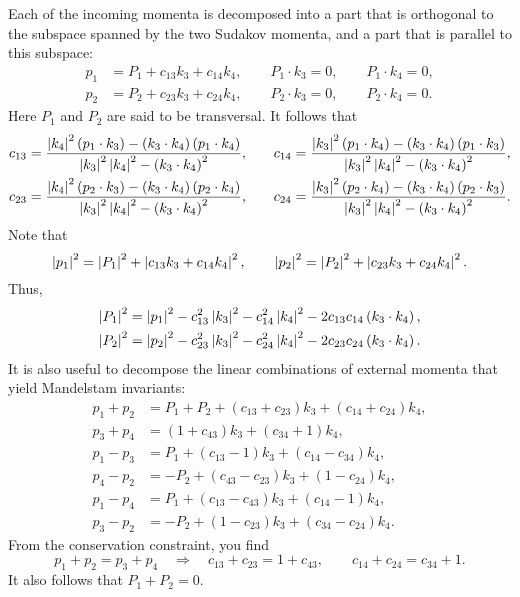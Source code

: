 Each of the incoming momenta is decomposed into a part that is orthogonal to the subspace spanned by the two Sudakov momenta, and a part that is parallel to this subspace:
\begin{align}
	p_{1} &= P_{1} + c_{13} k_{3} + c_{14} k_{4}, \qquad P_{1} \cdot k_{3} = 0, \qquad P_{1} \cdot k_{4} = 0, \\
	p_{2} &= P_{2} + c_{23} k_{3} + c_{24} k_{4}, \qquad P_{2} \cdot k_{3} = 0, \qquad P_{2} \cdot k_{4} = 0.
\end{align}
Here $P_{1}$ and $P_{2}$ are said to be transversal. It follows that
\begin{align}
	c_{13} = \frac{ \left\lvert k_{4} \right\rvert^{2} \left(p_{1} \cdot k_{3} \right) - \left(k_{3} \cdot k_{4} \right) \left(p_{1} \cdot k_{4} \right) }{\left\lvert k_{3} \right\rvert^{2} \left\lvert k_{4} \right\rvert^{2} - \left( k_{3} \cdot k_{4} \right)^{2}}, &\qquad
	c_{14} = \frac{ \left\lvert k_{3} \right\rvert^{2} \left(p_{1} \cdot k_{4} \right) - \left(k_{3} \cdot k_{4} \right) \left(p_{1} \cdot k_{3} \right) }{\left\lvert k_{3} \right\rvert^{2} \left\lvert k_{4} \right\rvert^{2} - \left( k_{3} \cdot k_{4} \right)^{2}}, \\
	c_{23} = \frac{\left\lvert k_{4} \right\rvert^{2} \left(p_{2} \cdot k_{3} \right) - \left(k_{3} \cdot k_{4} \right) \left(p_{2} \cdot k_{4} \right)}{\left\lvert k_{3} \right\rvert^{2} \left\lvert k_{4} \right\rvert^{2} - \left( k_{3} \cdot k_{4} \right)^{2}}, &\qquad
	c_{24} = \frac{ \left\lvert k_{3} \right\rvert^{2} \left(p_{2} \cdot k_{4} \right) - \left(k_{3} \cdot k_{4} \right) \left(p_{2} \cdot k_{3} \right) }{\left\lvert k_{3} \right\rvert^{2} \left\lvert k_{4} \right\rvert^{2} - \left( k_{3} \cdot k_{4} \right)^{2}}.
\end{align}
Note that
\begin{equation}
	\left\lvert p_{1} \right\rvert^{2} = \left\lvert P_{1} \right\rvert^{2} + \left\lvert c_{13} k_{3} + c_{14} k_{4} \right\rvert^{2}, \qquad \left\lvert p_{2} \right\rvert^{2} = \left\lvert P_{2} \right\rvert^{2} + \left\lvert c_{23} k_{3} + c_{24} k_{4} \right\rvert^{2}.
\end{equation}
Thus,
\begin{align}
	\left\lvert P_{1} \right\rvert^{2} &= \left\lvert p_{1} \right\rvert^{2} - c_{13}^{2} \left\lvert k_{3} \right\rvert^{2} - c_{14}^{2} \left\lvert k_{4} \right\rvert^{2} - 2 c_{13} c_{14} \left( k_{3} \cdot k_{4} \right), \\
	\left\lvert P_{2} \right\rvert^{2} &= \left\lvert p_{2} \right\rvert^{2} - c_{23}^{2} \left\lvert k_{3} \right\rvert^{2} - c_{24}^{2} \left\lvert k_{4} \right\rvert^{2} - 2 c_{23} c_{24} \left( k_{3} \cdot k_{4} \right).
\end{align}
It is also useful to decompose the linear combinations of external momenta that yield Mandelstam invariants:
\begin{align}
	p_{1} + p_{2} &= P_{1} + P_{2} + \left(c_{13} + c_{23}\right) k_{3} + \left(c_{14} + c_{24}\right) k_{4}, \\
	p_{3} + p_{4} &= \left(1 + c_{43}\right) k_{3} + \left(c_{34} + 1\right) k_{4}, \\
	p_{1} - p_{3} &= P_{1} + \left(c_{13} - 1\right) k_{3} + \left(c_{14} - c_{34}\right) k_{4}, \\
	p_{4} - p_{2} &= -P_{2} + \left(c_{43} - c_{23}\right) k_{3} + \left(1 - c_{24}\right) k_{4}, \\
	p_{1} - p_{4} &= P_{1} + \left(c_{13} - c_{43}\right) k_{3} + \left(c_{14} - 1\right) k_{4}, \\
	p_{3} - p_{2} &= -P_{2} + \left(1 - c_{23}\right) k_{3} + \left(c_{34} - c_{24}\right) k_{4}.
\end{align}
From the conservation constraint, you find
\begin{equation}
	p_{1} + p_{2} = p_{3} + p_{4} \quad \Longrightarrow \quad c_{13} + c_{23} = 1 + c_{43}, \qquad c_{14} + c_{24} = c_{34} + 1.
\end{equation}
It also follows that $P_{1} + P_{2} = 0$.
